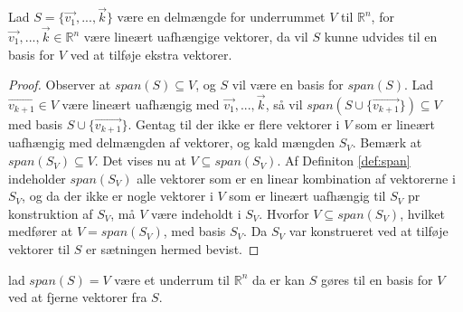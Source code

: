 \begin{stn}
Lad $S=\{\vec{v_1}, ..., \vec{k}\}$ være en delmængde for underrummet $V$ til $\mathds{R}^n$, for $\vec{v_1}, ..., \vec{k} \in \mathds{R}^n$ være lineært uafhængige vektorer, da vil $S$ kunne udvides til en basis for $V$ ved at tilføje ekstra vektorer.
\end{stn}
\begin{proof}
Observer at $span(S) \subseteq V$, og $S$ vil være en basis for $span(S)$.
Lad $\vec{v_{k+1}} \in V$ være lineært uafhængig med $\vec{v_1}, ..., \vec{k}$, så vil $span(S\cup\{\vec{v_{k+1}}\}) \subseteq V$ med basis $S\cup\{\vec{v_{k+1}}\}$. 
Gentag til der ikke er flere vektorer i $V$ som er lineært uafhængig med delmængden af vektorer, og kald mængden $S_V$.
Bemærk at $span(S_V) \subseteq V$.
Det vises nu at $V \subseteq span(S_V)$. 
Af Definiton \ref{def:span} indeholder $span(S_V)$ alle vektorer som er en linear kombination af vektorerne i $S_V$, og da der ikke er nogle vektorer i $V$ som er lineært uafhængig til $S_V$ pr konstruktion af $S_V$, må $V$ være indeholdt i $S_V$. 
Hvorfor $V \subseteq span(S_V)$, hvilket medfører at $V = span(S_V)$, med basis $S_V$. 
Da $S_V$ var konstrueret ved at tilføje vektorer til $S$ er sætningen hermed bevist.
\end{proof}



lad $span(S) = V$ være et underrum til $\mathds{R}^n$ da er kan $S$ gøres til en basis for $V$ ved at fjerne vektorer fra $S$.